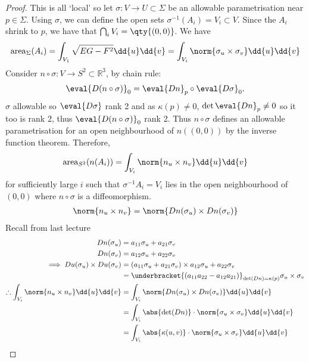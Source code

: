 \begin{proof}
	This is all `local' so let $\sigma: V \to U \subset \Sigma$ be an allowable parametrisation near $p \in \Sigma$.
	Using $\sigma$, we can define the open sets $\sigma^{-1}(A_i) = V_i \subset V$.
	Since the $A_i$ shrink to $p$, we have that $\bigcap_i V_i = \qty{(0,0)}$.
	We have
	\begin{align*}
		\mathrm{area}_\Sigma(A_i) = \int_{V_1} \sqrt{EG - F^2} \dd{u} \dd{v} = \int_{V_i} \norm{\sigma_u \times \sigma_v} \dd{u}\dd{v}
	\end{align*}
	Consider $n \circ \sigma: V \to S^2 \subset \mathbb{R}^3$, by chain rule:
	\begin{align*}
		\eval{D(n \circ \sigma)}_0 = \eval{Dn}_p \circ \eval{D \sigma}_0.
	\end{align*} 
	$\sigma$ allowable so $\eval{D \sigma}$ rank 2 and as $\kappa(p) \neq 0$, $\det \eval{Dn}_p \neq 0$ so it too is rank 2, thus $\eval{D(n \circ \sigma)}_0$ rank 2.
	Thus $n \circ \sigma$ defines an allowable parametrisation for an open neighbourhood of $n((0,0))$ by the inverse function theorem.
	Therefore,
	\begin{align*}
		\mathrm{area}_{S^2}(n(A_i)) = \int_{V_i} \norm{n_u \times n_v} \dd{u} \dd{v}
	\end{align*}
	for sufficiently large $i$ such that $\sigma^{-1} A_i = V_i$ lies in the open neighbourhood of $(0,0)$ where $n \circ \sigma$ is a diffeomorphism.
	\begin{align*}
		\norm{n_u \times n_v} = \norm{Dn(\sigma_u) \times Dn(\sigma_v)}
	\end{align*} 
	Recall from last lecture 
	\begin{align*}
		Dn(\sigma_u) &= a_{11} \sigma_u + a_{21} \sigma_v \\
		Dn(\sigma_v) &= a_{12} \sigma_u + a_{22} \sigma_v \\
		\implies Du(\sigma_u) \times Du(\sigma_v) &= (a_{11} \sigma_u + a_{21} \sigma_v) \times a_{12} \sigma_u + a_{22} \sigma_v \\
		&= \underbracket{(a_{11} a_{22} - a_{12} a_{21})}_{\det(Dn) = \kappa(p)} \sigma_u \times \sigma_v \\
		\therefore \int_{V_i} \norm{n_u \times n_v} \dd{u} \dd{v} & = \int_{V_i} \norm{Dn(\sigma_u) \times Dn(\sigma_v)} \dd{u} \dd{v} \\
		& = \int_{V_i} \abs{\det (Dn)} \cdot \norm{\sigma_u \times \sigma_v} \dd{u} \dd{v} \\
		& = \int_{V_i} \abs{\kappa(u,v)} \cdot \norm{\sigma_u \times \sigma_v} \dd{u}\dd{v}

\end{align*}
\end{proof}
